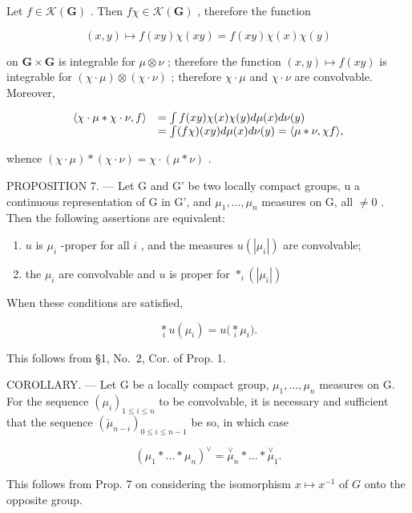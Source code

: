 Let \(f \in \mathcal{K}(\mathbf{G})\) . Then \(f\chi \in \mathcal{K}(\mathbf{G})\) , therefore the function

\[
(x, y) \mapsto f (x y) \chi (x y) = f (x y) \chi (x) \chi (y)
\]

on \(\mathbf{G} \times \mathbf{G}\) is integrable for \(\mu \otimes \nu\) ; therefore the function \((x, y) \mapsto f(xy)\) is integrable for \((\chi \cdot \mu) \otimes (\chi \cdot \nu)\) ; therefore \(\chi \cdot \mu\) and \(\chi \cdot \nu\) are convolvable. Moreover,

\[
\begin{array}{r l} \langle \chi \cdot \mu * \chi \cdot \nu , f \rangle & = \int f (x y) \chi (x) \chi (y) d \mu (x) d \nu (y) \\ & = \int (f \chi) (x y) d \mu (x) d \nu (y) = \langle \mu * \nu , \chi f \rangle , \end{array}
\]

whence \((\chi \cdot \mu) * (\chi \cdot \nu) = \chi \cdot (\mu * \nu)\) .

PROPOSITION 7. --- Let G and G' be two locally compact groups, u a continuous representation of G in G', and \(\mu_{1},\ldots,\mu_{n}\) measures on G, all \(\neq0\) . Then the following assertions are equivalent:

\begin{enumerate}
\def\labelenumi{(\roman{enumi})}
\item
  \(u\) is \(\mu_{i}\) -proper for all \(i\) , and the measures \(u(|\mu_i|)\) are convolvable;
\item
  the \(\mu_{i}\) are convolvable and \(u\) is proper for \(*_{i}(|\mu_{i}|)\)
\end{enumerate}

When these conditions are satisfied,

\[
\underset {i} {\ast} u (\mu_ {i}) = u \Big (\underset {i} {\ast} \mu_ {i} \Big).
\]

This follows from §1, No.~2, Cor. of Prop. 1.

COROLLARY. --- Let G be a locally compact group, \(\mu_{1},\ldots,\mu_{n}\) measures on G. For the sequence \((\mu_{i})_{1\leqslant i\leqslant n}\) to be convolvable, it is necessary and sufficient that the sequence \((\breve{\mu}_{n-i})_{0\leqslant i\leqslant n-1}\) be so, in which case

\[
\left(\mu_ {1} * \dots * \mu_ {n}\right) ^ {\vee} = \stackrel {\vee} {\mu} _ {n} * \dots * \stackrel {\vee} {\mu} _ {1}.
\]

This follows from Prop. 7 on considering the isomorphism \(x \mapsto x^{-1}\) of \(G\) onto the opposite group.

